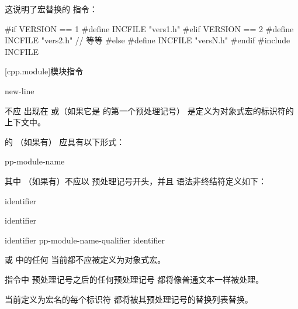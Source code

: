     \pnum
    \begin{example}
    这说明了宏替换的
    指令：
    
    \begin{codeblock}
    #if VERSION == 1
        #define INCFILE  "vers1.h"
    #elif VERSION == 2
        #define INCFILE  "vers2.h"  // 等等
    #else
        #define INCFILE  "versN.h"
    #endif
    #include INCFILE
    \end{codeblock}
    \end{example}
    
    [cpp.module]{模块指令}
    
    \begin{bnf}
    \br
           \terminal{;} new-line
    \end{bnf}
    
    \pnum
     不应
    出现在 
    或（如果它是  的第一个预处理记号）
    是定义为对象式宏的标识符的上下文中。
    
    \pnum
     的 （如果有）
    应具有以下形式：
    \begin{ncsimplebnf}
    pp-module-name  
    \end{ncsimplebnf}
    其中 （如果有）不应以
    \tcode{(} 预处理记号开头，并且
    语法非终结符定义如下：
    \begin{ncbnf}
    \br
         identifier
    \end{ncbnf}
    \begin{ncbnf}
    \br
        \terminal{:}  identifier
    \end{ncbnf}
    \begin{ncbnf}
    \br
        identifier \br
        pp-module-name-qualifier identifier 
    \end{ncbnf}
     或  中的任何 
    当前都不应被定义为对象式宏。
    
    \pnum
     指令中  预处理记号之后的任何预处理记号
    都将像普通文本一样被处理。
    \begin{note}
    当前定义为宏名的每个标识符
    都将被其预处理记号的替换列表替换。
    \end{note}
    
